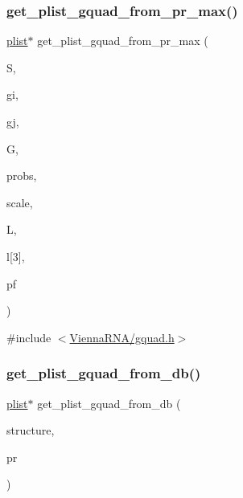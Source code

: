 \subsubsection{\texorpdfstring{get\+\_\+plist\+\_\+gquad\+\_\+from\+\_\+pr\+\_\+max()}{get\_plist\_gquad\_from\_pr\_max()}}
{\footnotesize\ttfamily \mbox{\hyperlink{group__data__structures_ga9608eed021ebfbdd7a901cfdc446c8e9}{plist}}$\ast$ get\+\_\+plist\+\_\+gquad\+\_\+from\+\_\+pr\+\_\+max (\begin{DoxyParamCaption}\item[{short $\ast$}]{S,  }\item[{int}]{gi,  }\item[{int}]{gj,  }\item[{\mbox{\hyperlink{group__data__structures_ga31125aeace516926bf7f251f759b6126}{F\+L\+T\+\_\+\+O\+R\+\_\+\+D\+BL}} $\ast$}]{G,  }\item[{\mbox{\hyperlink{group__data__structures_ga31125aeace516926bf7f251f759b6126}{F\+L\+T\+\_\+\+O\+R\+\_\+\+D\+BL}} $\ast$}]{probs,  }\item[{\mbox{\hyperlink{group__data__structures_ga31125aeace516926bf7f251f759b6126}{F\+L\+T\+\_\+\+O\+R\+\_\+\+D\+BL}} $\ast$}]{scale,  }\item[{int $\ast$}]{L,  }\item[{int}]{l\mbox{[}3\mbox{]},  }\item[{\mbox{\hyperlink{group__energy__parameters_ga01d8b92fe734df8d79a6169482c7d8d8}{vrna\+\_\+exp\+\_\+param\+\_\+t}} $\ast$}]{pf }\end{DoxyParamCaption})}



{\ttfamily \#include $<$\mbox{\hyperlink{gquad_8h}{Vienna\+R\+N\+A/gquad.\+h}}$>$}

\mbox{\label{group__gquads_ga0fc4f48d749837ca7d5495d34a280c32}} 
\subsubsection{\texorpdfstring{get\+\_\+plist\+\_\+gquad\+\_\+from\+\_\+db()}{get\_plist\_gquad\_from\_db()}}
{\footnotesize\ttfamily \mbox{\hyperlink{group__data__structures_ga9608eed021ebfbdd7a901cfdc446c8e9}{plist}}$\ast$ get\+\_\+plist\+\_\+gquad\+\_\+from\+\_\+db (\begin{DoxyParamCaption}\item[{const char $\ast$}]{structure,  }\item[{float}]{pr }\end{DoxyParamCaption})}



